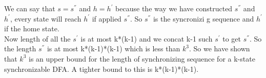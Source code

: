 \documentclass{article}
\begin{document}
We can say that $s=s^{''}$ and $h=h^{'}$ because the way we have constructed $s^{''}$ and $h^{'}$, every state will reach $h^{'}$ if applied $s^{''}$. So $s^{''}$ is the syncronizi g sequence and $h^{'}$ if the home state. \\
Now length of all the  $s^{'}$ is at most k*(k-1) and we concat k-1 such  $s^{'}$ to get  $s^{''}$. So the length  $s^{''}$ is at most k*(k-1)*(k-1) which is less than $k^3$. So we have shown that $k^3$ is an upper bound for the length of synchronizing sequence for a k-state synchronizable DFA. A tighter bound to this is k*(k-1)*(k-1).
\pagebreak
\end{document}
